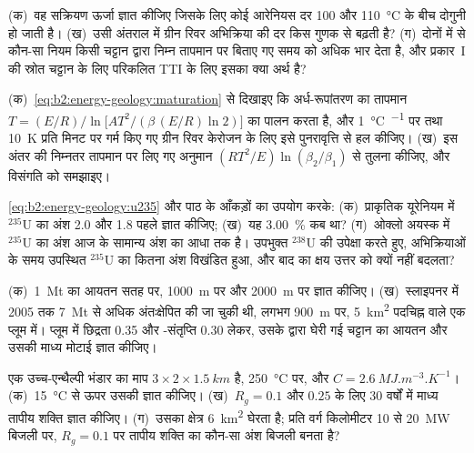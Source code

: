 \begin{exercise}[$\star\star$]\label{exo:b2:energy-geology:5}
(क)~वह सक्रियण ऊर्जा ज्ञात कीजिए जिसके लिए कोई आरेनियस दर 100 और
\qty{110}{\celsius} के बीच दोगुनी हो जाती है। (ख)~उसी अंतराल में ग्रीन रिवर अभिक्रिया की दर किस गुणक से बढ़ती है?
(ग)~दोनों में से कौन-सा नियम किसी चट्टान द्वारा निम्न तापमान पर बिताए गए समय को अधिक भार देता है,
और प्रकार~I की स्रोत चट्टान के लिए परिकलित TTI के लिए इसका क्या अर्थ है?
\end{exercise}

\begin{exercise}[$\star\star$]\label{exo:b2:energy-geology:6}
(क)~\eqref{eq:b2:energy-geology:maturation} से दिखाइए कि अर्ध-रूपांतरण का तापमान
$T = (E/R)\big/\ln\bigl[A T^2/(\beta\,(E/R)\ln 2)\bigr]$ का पालन करता है, और \qty{1}{\celsius\per\Myr} पर तथा
\qty{10}{K} प्रति मिनट पर गर्म किए गए ग्रीन रिवर केरोजन के लिए इसे पुनरावृत्ति से हल कीजिए। (ख)~इस अंतर की
निम्नतर तापमान पर लिए गए अनुमान $(RT^2/E)\ln(\beta_2/\beta_1)$ से तुलना कीजिए, और
विसंगति को समझाइए।
\end{exercise}

\begin{exercise}[$\star\star$]\label{exo:b2:energy-geology:7}
\eqref{eq:b2:energy-geology:u235} और पाठ के आँकड़ों का उपयोग करके: (क)~प्राकृतिक यूरेनियम में $^{235}$U का अंश
\qty{2.0}{\Ga} और \qty{1.8}{\Ga} पहले ज्ञात कीजिए; (ख)~यह \qty{3.00}{\percent} कब था?
(ग)~ओक्लो अयस्क में $^{235}$U का अंश आज के सामान्य अंश का आधा तक है। उपभुक्त $^{238}$U की उपेक्षा करते हुए,
अभिक्रियाओं के समय उपस्थित $^{235}$U का कितना अंश विखंडित हुआ, और बाद का क्षय उत्तर को
क्यों नहीं बदलता?
\end{exercise}

\begin{exercise}[$\star\star$]\label{exo:b2:energy-geology:8}
(क)~\qty{1}{Mt}  का आयतन सतह पर, \qty{1000}{m} पर और \qty{2000}{m} पर ज्ञात कीजिए। (ख)~स्लाइपनर में
2005 तक \qty{7}{Mt} से अधिक अंतःक्षेपित की जा चुकी थी, लगभग \qty{900}{m} पर, \qty{5}{km^2} पदचिह्न वाले एक प्लूम
में। प्लूम में छिद्रता 0.35 और -संतृप्ति 0.30 लेकर, उसके द्वारा घेरी गई चट्टान का आयतन और उसकी
माध्य मोटाई ज्ञात कीजिए।
\end{exercise}

\begin{exercise}[$\star\star$]\label{exo:b2:energy-geology:9}
एक उच्च-एन्थैल्पी भंडार का माप $3 \times 2 \times \qty{1.5}{km}$ है, \qty{250}{\celsius} पर, और
$C = \qty{2.6}{MJ.m^{-3}.K^{-1}}$। (क)~\qty{15}{\celsius} से ऊपर उसकी  ज्ञात कीजिए। (ख)~$R_g = 0.1$ और $0.25$ के लिए 30 वर्षों में
माध्य तापीय शक्ति ज्ञात कीजिए। (ग)~उसका क्षेत्र \qty{6}{km^2} घेरता है;
प्रति वर्ग किलोमीटर 10 से \qty{20}{MW} बिजली पर, $R_g = 0.1$ पर तापीय शक्ति का कौन-सा अंश
बिजली बनता है?
\end{exercise}

